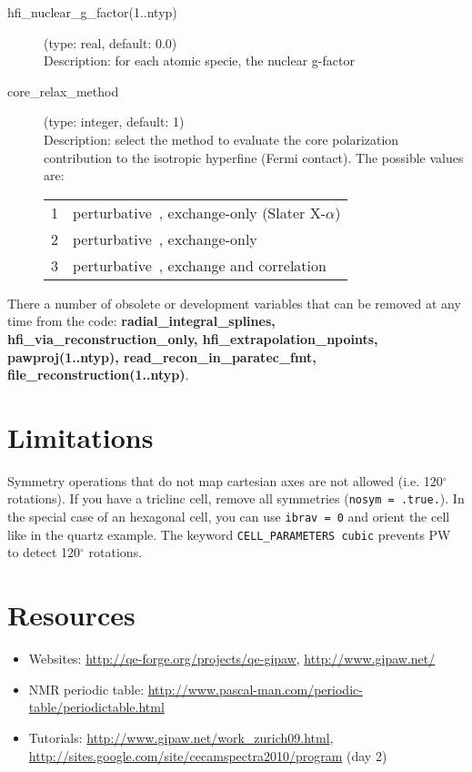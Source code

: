 \documentclass[a4paper,11pt,twoside]{article}
\begin{document}
\begin{description}
\item[hfi\_nuclear\_g\_factor(1..ntyp)] (type: real, default: 0.0)\\
Description: for each atomic specie, the nuclear g-factor

\item[core\_relax\_method] (type: integer, default: 1)\\
Description: select the method to evaluate the core polarization contribution
to the isotropic hyperfine (Fermi contact). The possible values are:\\
\begin{tabular}{ll}
  1 & perturbative~\cite{bahramy07}, exchange-only (Slater X-$\alpha$)\\
  2 & perturbative~\cite{bahramy07}, exchange-only\\
  3 & perturbative~\cite{bahramy07}, exchange and correlation\\
\end{tabular}

\end{description}
There a number of obsolete or development variables that can be removed at any
time from the code: \textbf{radial\_integral\_splines,
hfi\_via\_reconstruction\_only, hfi\_extrapolation\_npoints, pawproj(1..ntyp),
read\_recon\_in\_paratec\_fmt, file\_reconstruction(1..ntyp)}.


\section{Limitations}
Symmetry operations that do not map cartesian axes are not allowed
(i.e. 120$^\circ$ rotations). If you have a triclinc cell, remove all
symmetries (\texttt{nosym = .true.}). In the special case of an hexagonal
cell, you can use \texttt{ibrav = 0} and orient the cell like in the
quartz example. The keyword \texttt{CELL\_PARAMETERS cubic} prevents PW
to detect 120$^\circ$ rotations.


\section{Resources}
\begin{itemize}
\item Websites: \url{http://qe-forge.org/projects/qe-gipaw}, \url{http://www.gipaw.net/}
\item NMR periodic table: \url{http://www.pascal-man.com/periodic-table/periodictable.html}
\item Tutorials: \url{http://www.gipaw.net/work_zurich09.html},
                 \url{http://sites.google.com/site/cecamspectra2010/program} (day 2)
\end{itemize}
\end{document}
